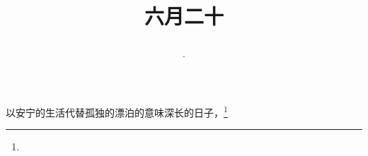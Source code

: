 \title{\date[d=25,m=7,y=2024][year:cn-y,年,month:cn,day:cn,日,·,weekday]·六月二十 }
以安宁的生活代替孤独的漂泊的意味深长的日子，\footnote{ }

